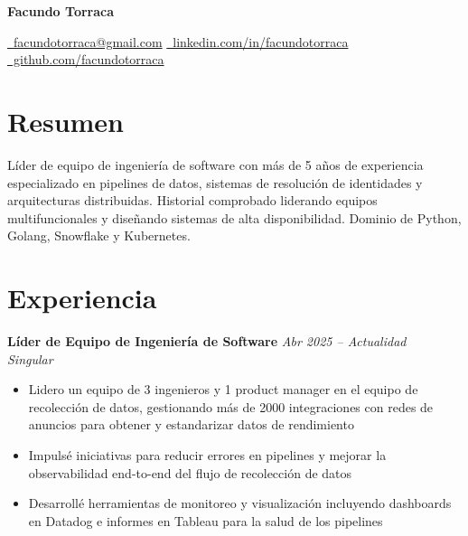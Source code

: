 \documentclass[10pt,a4paper]{article}
\newcommand{\cventry}[3]{%
  \textbf{#1} \hfill \textit{#3}\\[3pt]
  \textit{#2}%
}
\begin{document}
\begin{center}
  {\LARGE\bfseries Facundo Torraca}

  \vspace{0.25cm}

  \href{mailto:facundotorraca@gmail.com}
    {\faEnvelope\ facundotorraca@gmail.com}
  \quad\textperiodcentered\quad
  \href{https://linkedin.com/in/facundotorraca}
    {\faLinkedin\ linkedin.com/in/facundotorraca}
  \quad\textperiodcentered\quad
  \href{https://github.com/facundotorraca}
    {\faGithub\ github.com/facundotorraca}
\end{center}

\section*{Resumen}
Líder de equipo de ingeniería de software con más de 5 años de experiencia
especializado en pipelines de datos, sistemas de resolución de identidades y
arquitecturas distribuidas. Historial comprobado liderando equipos
multifuncionales y diseñando sistemas de alta disponibilidad. Dominio de
Python, Golang, Snowflake y Kubernetes.

\section*{Experiencia}

\cventry{Líder de Equipo de Ingeniería de Software}{Singular}{Abr 2025 -- Actualidad}
\begin{itemize}[leftmargin=*, noitemsep, topsep=3pt, itemsep=2pt]
  \item Lidero un equipo de 3 ingenieros y 1 product manager en el equipo de
        recolección de datos, gestionando más de 2000 integraciones con redes
        de anuncios para obtener y estandarizar datos de rendimiento
  \item Impulsé iniciativas para reducir errores en pipelines y mejorar la
        observabilidad end-to-end del flujo de recolección de datos
  \item Desarrollé herramientas de monitoreo y visualización incluyendo
        dashboards en Datadog e informes en Tableau para la salud de los pipelines
\end{itemize}
\end{document}
